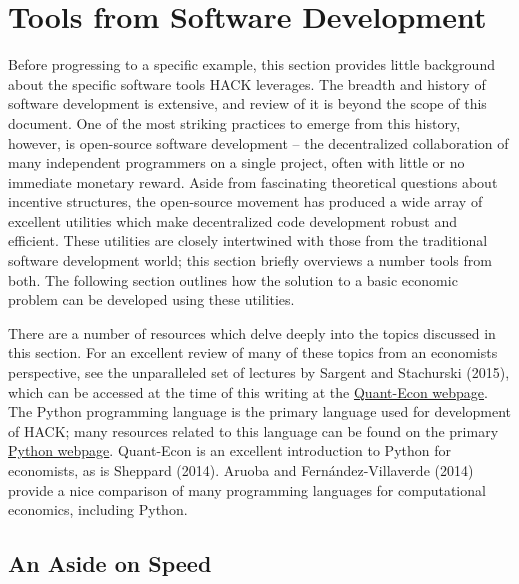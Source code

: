 \documentclass[]{article}
\begin{document}
\section{Tools from Software
Development}\label{tools-from-software-development}

Before progressing to a specific example, this section provides little
background about the specific software tools HACK leverages. The breadth
and history of software development is extensive, and review of it is
beyond the scope of this document. One of the most striking practices to
emerge from this history, however, is open-source software development
-- the decentralized collaboration of many independent programmers on a
single project, often with little or no immediate monetary reward. Aside
from fascinating theoretical questions about incentive structures, the
open-source movement has produced a wide array of excellent utilities
which make decentralized code development robust and efficient. These
utilities are closely intertwined with those from the traditional
software development world; this section briefly overviews a number
tools from both. The following section outlines how the solution to a
basic economic problem can be developed using these utilities.

There are a number of resources which delve deeply into the topics
discussed in this section. For an excellent review of many of these
topics from an economists perspective, see the unparalleled set of
lectures by Sargent and Stachurski (2015)\href{REF}{}, which can be
accessed at the time of this writing at the
\href{http://www.quant-econ.net}{Quant-Econ webpage}. The Python
programming language is the primary language used for development of
HACK; many resources related to this language can be found on the
primary \href{https://www.python.org/}{Python webpage}. Quant-Econ is an
excellent introduction to Python for economists, as is Sheppard
(2014)\href{REF}{}. Aruoba and Fernández-Villaverde (2014) provide a
nice comparison of many programming languages for computational
economics, including Python.

\subsection{An Aside on Speed}\label{an-aside-on-speed}
\end{document}
